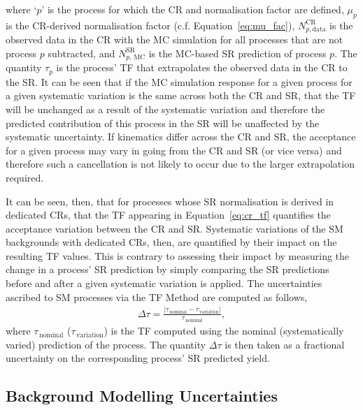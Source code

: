 where `$p$' is the process for which the CR and normalisation factor are defined, $\mu_p$
is the CR-derived normalisation factor (c.f. Equation~\ref{eq:mu_fac}),
$N_{p, \text{data}}^{\text{CR}}$ is the observed data in the CR with the MC simulation
for all processes that are not process $p$ subtracted, and $N_{p,\,\text{MC}}^{\text{SR}}$
is the MC-based SR prediction of process $p$.
The quantity $\tau_p$ is the process' TF that extrapolates the observed data in the CR
to the SR.
It can be seen that if the MC simulation response for a given process for a given systematic variation is the same
across both the CR and SR, that the TF will be unchanged as a result of the systematic
variation and therefore the predicted contribution of this process in the SR will
be unaffected by the systematic uncertainty.
If kinematics differ across the CR and SR, the acceptance for a given process may vary
in going from the CR and SR (or vice versa) and therefore such a cancellation is not likely to
occur due to the larger extrapolation required.

It can be seen, then, that for processes whose SR normalisation is derived in dedicated CRs,
that the TF appearing in Equation~\ref{eq:cr_tf} quantifies the acceptance
variation between the CR and SR.
Systematic variations of the SM backgrounds with dedicated CRs, then, are quantified
by their impact on the resulting TF values.
This is contrary to assessing their impact by measuring the change in a process' SR prediction
by simply comparing the SR predictions before and after a given systematic variation is applied.
The uncertainties ascribed to SM processes via the TF Method are computed as follows,
\begin{align}
    \Delta \tau = \frac{ \lvert \tau_{\,\text{nominal}} - \tau_{\,\text{variation}} \rvert} { \tau_{\,\text{nominal}} },
    \label{eq:tf_uncert}
\end{align}
where $\tau_{\,\text{nominal}}$ ($\tau_{\,\text{variation}}$) is the TF computed
using the nominal (systematically varied) prediction of the process.
The quantity $\Delta \tau$ is then taken as a fractional uncertainty on the corresponding
process' SR predicted yield.

%
%

\subsection{Background Modelling Uncertainties}
\label{sec:syst_bkg_modelling}

